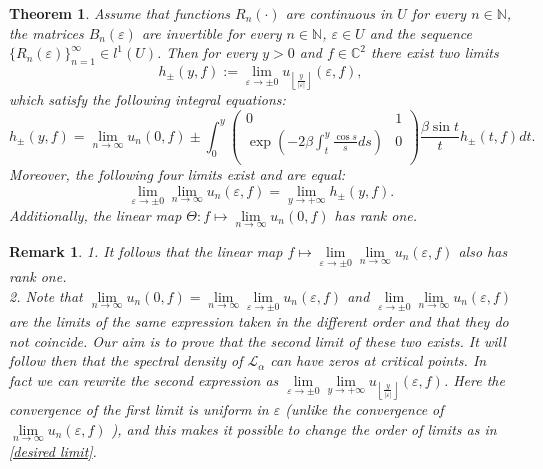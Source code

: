 \documentclass[a4paper,oneside,12pt]{amsart}
\newtheorem{thm}{Theorem}
\newtheorem{rem}{Remark}
\begin{document}
    \begin{thm}\label{thm discrete-continuous}
    Assume that functions $R_n(\cdot)$ are continuous in $U$ for every $n\in\mathbb N$, the matrices $B_n(\varepsilon)$ are invertible for every $n\in\mathbb N$, $\varepsilon\in U$ and the sequence $\{R_n(\varepsilon)\}_{n=1}^{\infty}\in l^1(U)$.
    Then for every $y>0$ and $f\in\mathbb C^2$ there exist two limits
    \begin{equation*}
        h_{\pm}(y,f):=\lim\limits_{\varepsilon\rightarrow\pm0}u_{\left\lfloor\frac y{|\varepsilon|}\right\rfloor}(\varepsilon,f),
    \end{equation*}
    which satisfy the following integral equations:
    \begin{equation}\label{equations for h}
    h_{\pm}(y,f)=\lim_{n\rightarrow\infty}u_n(0,f)
    \pm\int_0^y
    \left(
      \begin{array}{cc}
        0 & 1 \\
        \exp\left(-2\beta\int_t^y\frac{\cos s}sds\right) & 0 \\
      \end{array}
    \right)
    \frac{\beta\sin t}th_{\pm}(t,f)dt.
    \end{equation}
    Moreover, the following four limits exist and are equal:
    \begin{equation}\label{desired limit}
        \lim_{\varepsilon\rightarrow\pm0}\lim_{n\rightarrow\infty}u_n(\varepsilon,f)=\lim_{y\rightarrow+\infty}h_{\pm}(y,f).
    \end{equation}
    Additionally, the linear map $\Theta:f\mapsto \lim\limits_{n\rightarrow\infty}u_n(0,f)$ has rank one.
    \end{thm}

    \begin{rem}
    1. It follows that the linear map $f\mapsto\lim\limits_{\varepsilon\rightarrow\pm0}\lim\limits_{n\rightarrow\infty}u_n(\varepsilon,f)$ also has rank one.
    \\
    2. Note that $\lim\limits_{n\rightarrow\infty}u_n(0,f)
    =\lim\limits_{n\rightarrow\infty}\lim\limits_{\varepsilon\rightarrow\pm0}u_n(\varepsilon,f)$ and $\lim\limits_{\varepsilon\rightarrow\pm0}\lim\limits_{n\rightarrow\infty}u_n(\varepsilon,f)$ are the limits of the same expression taken in the different order and that they do not coincide. Our aim is to prove that the second limit of these two exists. It will follow then that the spectral density of $\mathcal L_{\alpha}$ can have zeros at critical points. In fact we can rewrite the second expression as
    $\lim\limits_{\varepsilon\rightarrow\pm0}\lim\limits_{y\rightarrow+\infty}u_{\left\lfloor\frac y{|\varepsilon|}\right\rfloor}(\varepsilon,f)$.
    Here the convergence of the first limit is uniform in $\varepsilon$ (unlike the convergence of $\lim\limits_{n\rightarrow\infty}u_n(\varepsilon,f)$ ), and this makes it possible to change the order of limits as in \eqref{desired limit}.
    \end{rem}
\end{document}
